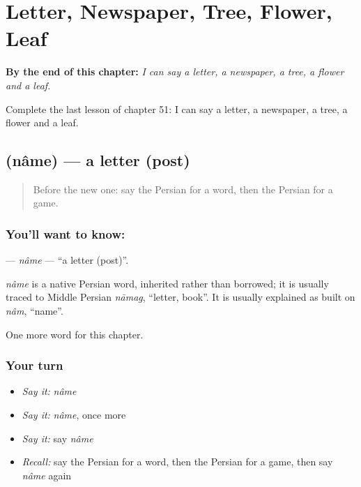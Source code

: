 
\chapter{Letter, Newspaper, Tree, Flower, Leaf}
\label{ch:fa-letter-newspaper-tree-flower-leaf}

\begin{chapteropening}
\textbf{By the end of this chapter:} \emph{I can say a letter, a newspaper, a tree, a flower and a leaf.}

Complete the last lesson of chapter 51: I can say a letter, a newspaper, a tree, a flower and a leaf.
\end{chapteropening}

\section[\texorpdfstring{\fa{نامه} (nâme)}{نامه (nâme)}]{ (nâme) — a letter (post)}

\label{lesson:FA-C51-name}



\begin{quote}
Before the new one: say the Persian for a word, then the Persian for a game.
\end{quote}

\subsection*{You'll want to know: }
\textbf{} — \emph{nâme} — \textquotedblleft{}a letter (post)\textquotedblright{}.

\begin{cousinweb}
\emph{nâme} is a native Persian word, inherited rather than borrowed; it is usually traced to Middle Persian \emph{nāmag}, \textquotedblleft{}letter, book\textquotedblright{}. It is usually explained as built on \emph{nâm}, \textquotedblleft{}name\textquotedblright{}.
\end{cousinweb}

\begin{grammarlens}[title={What you've built}]
One more word for this chapter.
\end{grammarlens}

\subsection*{Your turn}
\begin{itemize}
\raggedright
  \item \emph{Say it:} \emph{nâme}
  \item \emph{Say it:} \emph{nâme}, once more
  \item \emph{Say it:} say \emph{nâme}
  \item \emph{Recall:} say the Persian for a word, then the Persian for a game, then say \emph{nâme} again
\end{itemize}

